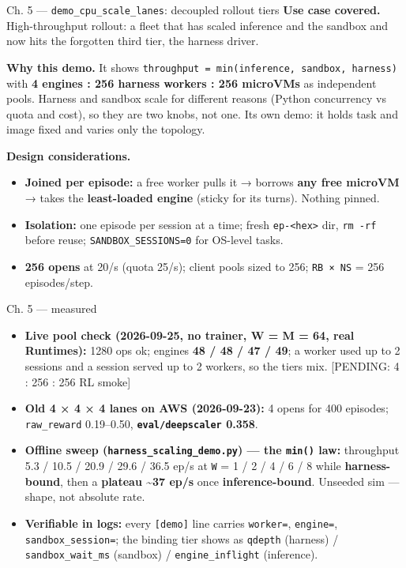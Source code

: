 \documentclass[
  10pt,
  ignorenonframetext,
  aspectratio=169,
  t]{beamer}
\providecommand{\tightlist}{%
  \setlength{\itemsep}{0pt}\setlength{\parskip}{0pt}}
\begin{document}
\begin{frame}{Ch. 5 --- \texttt{demo\_cpu\_scale\_lanes}:
decoupled rollout tiers}
\protect\hypertarget{ch.-5-demo_cpu_scale_lanes-decoupled-rollout-tiers}{}
\textbf{Use case covered.} High-throughput rollout: a fleet that has
scaled inference and the sandbox and now hits the forgotten third tier,
the harness driver.

\textbf{Why this demo.} It shows
\texttt{throughput\ =\ min(inference,\ sandbox,\ harness)} with
\textbf{4 engines : 256 harness workers : 256 microVMs} as independent
pools. Harness and sandbox scale for different reasons (Python
concurrency vs quota and cost), so they are two knobs, not one. Its own
demo: it holds task and image fixed and varies only the topology.

\textbf{Design considerations.}

\begin{itemize}
\tightlist
\item
  \textbf{Joined per episode:} a free worker pulls it → borrows
  \textbf{any free microVM} → takes the \textbf{least-loaded engine}
  (sticky for its turns). Nothing pinned.
\item
  \textbf{Isolation:} one episode per session at a time; fresh
  \texttt{ep-\textless{}hex\textgreater{}} dir, \texttt{rm\ -rf} before
  reuse; \texttt{SANDBOX\_SESSIONS=0} for OS-level tasks.
\item
  \textbf{256 opens} at 20/s (quota 25/s); client pools sized to 256;
  \texttt{RB\ ×\ NS} = 256 episodes/step.
\end{itemize}
\end{frame}

\begin{frame}{Ch. 5 --- measured}
\protect\hypertarget{ch.-5-measured}{}
\begin{itemize}
\tightlist
\item
  \textbf{Live pool check (2026-09-25, no trainer, W = M = 64, real
  Runtimes):} 1280 ops ok; engines \textbf{48 / 48 / 47 / 49}; a worker
  used up to 2 sessions and a session served up to 2 workers, so the
  tiers mix. {[}PENDING: 4 : 256 : 256 RL smoke{]}
\item
  \textbf{Old 4 × 4 × 4 lanes on AWS (2026-09-23):} 4 opens for 400
  episodes; \texttt{raw\_reward} 0.19--0.50,
  \textbf{\texttt{eval/deepscaler} 0.358}.
\item
  \textbf{Offline sweep (\texttt{harness\_scaling\_demo.py}) --- the
  \texttt{min()} law:} throughput 5.3 / 10.5 / 20.9 / 29.6 / 36.5 ep/s
  at \texttt{W} = 1 / 2 / 4 / 6 / 8 while \textbf{harness-bound}, then a
  \textbf{plateau \textasciitilde37 ep/s} once \textbf{inference-bound}.
  Unseeded sim --- shape, not absolute rate.
\item
  \textbf{Verifiable in logs:} every \texttt{{[}demo{]}} line carries
  \texttt{worker=}, \texttt{engine=}, \texttt{sandbox\_session=}; the
  binding tier shows as \texttt{qdepth} (harness) /
  \texttt{sandbox\_wait\_ms} (sandbox) / \texttt{engine\_inflight}
  (inference).
\end{itemize}
\end{frame}
\end{document}
